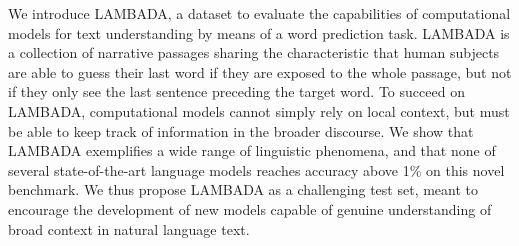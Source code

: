 We introduce LAMBADA, a dataset to evaluate the capabilities of computational models for text understanding by means of a word prediction task. LAMBADA is a collection of narrative passages sharing the characteristic that human subjects are able to guess their last word if they are exposed to the whole passage, but not if they only see the last sentence preceding the target word. To succeed on LAMBADA, computational models cannot simply rely on local context, but must be able to keep track of information in the broader discourse. We show that LAMBADA exemplifies a wide range of linguistic phenomena, and that none of several state-of-the-art language models reaches accuracy above 1\% on this novel benchmark. We thus propose LAMBADA as a challenging test set, meant to encourage the development of new models capable of genuine understanding of broad context in natural language text.
